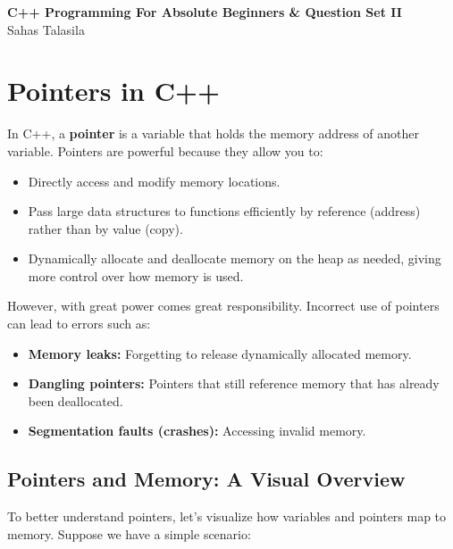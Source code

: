 \documentclass[a4paper,12pt]{article}
\begin{document}
\pagestyle{empty} 

\begin{titlepage}
    \centering
    \vspace*{2cm}
    \Huge{\textbf{C++ Programming For Absolute Beginners \& Question Set II}} \\[1.5cm]
    \Large{Sahas Talasila} \\[1cm]
    \vfill
    \vfill
\end{titlepage}

\tableofcontents
\newpage

\section{Pointers in C++}

In C++, a \textbf{pointer} is a variable that holds the memory address of another variable. Pointers are powerful because they allow you to:
\begin{itemize}
    \item Directly access and modify memory locations.
    \item Pass large data structures to functions efficiently by reference (address) rather than by value (copy).
    \item Dynamically allocate and deallocate memory on the heap as needed, giving more control over how memory is used.
\end{itemize}

However, with great power comes great responsibility. Incorrect use of pointers can lead to errors such as:
\begin{itemize}
    \item \textbf{Memory leaks:} Forgetting to release dynamically allocated memory.
    \item \textbf{Dangling pointers:} Pointers that still reference memory that has already been deallocated.
    \item \textbf{Segmentation faults (crashes):} Accessing invalid memory.
\end{itemize}

\subsection{Pointers and Memory: A Visual Overview}
To better understand pointers, let's visualize how variables and pointers map to memory. Suppose we have a simple scenario:
\end{document}
